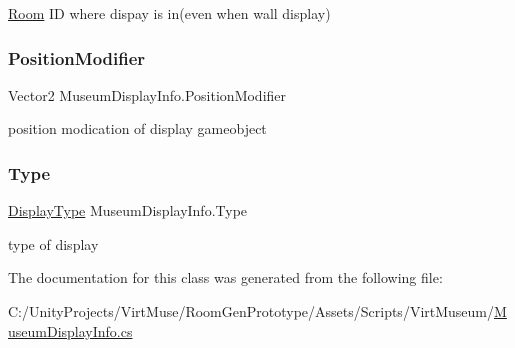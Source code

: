 \mbox{\hyperlink{class_room}{Room}} ID where dispay is in(even when wall display) 

\mbox{\label{class_museum_display_info_ab51b43a4fad77be4256ee61a957bfbfb}} 
\subsubsection{\texorpdfstring{Position\+Modifier}{PositionModifier}}
{\footnotesize\ttfamily Vector2 Museum\+Display\+Info.\+Position\+Modifier}



position modication of display gameobject 

\mbox{\label{class_museum_display_info_af1d44e6a63020a6ba8e2f5dff181ecbf}} 
\subsubsection{\texorpdfstring{Type}{Type}}
{\footnotesize\ttfamily \mbox{\hyperlink{_museum_8cs_a18c0cbeece6bcb1c64d7463ce253ff50}{Display\+Type}} Museum\+Display\+Info.\+Type}



type of display 



The documentation for this class was generated from the following file\+:\begin{DoxyCompactItemize}
\item 
C\+:/\+Unity\+Projects/\+Virt\+Muse/\+Room\+Gen\+Prototype/\+Assets/\+Scripts/\+Virt\+Museum/\mbox{\hyperlink{_museum_display_info_8cs}{Museum\+Display\+Info.\+cs}}\end{DoxyCompactItemize}
